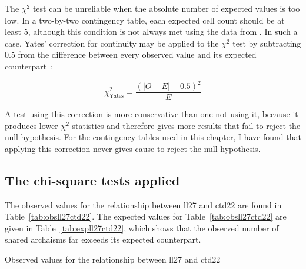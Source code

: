 
The \(\chi^2\) test can be unreliable when the absolute number of expected values is too low. In a two-by-two contingency table, each expected cell count should be at least 5, although this condition is not always met using the data from . In such a case, Yates' correction for continuity may be applied to the \(\chi^2\) test by subtracting 0.5 from the difference between every observed value and its expected counterpart~\autocite[222]{Yat_Contingency34}:

\[\chi_\text{Yates}^2 =  \frac{(|O - E| - 0.5)^2}{E}\]

A test using this correction is more conservative than one not using it, because it produces lower \(\chi^2\) statistics and therefore gives more results that fail to reject the null hypothesis. For the contingency tables used in this chapter, I have found that applying this correction never gives cause to reject the null hypothesis.

\subsection{The chi-square tests applied}
\label{sec:chisqapplied}

The observed values for the relationship between \gls{ll27} and \gls{ctd22} are found in Table~\ref{tab:obsll27ctd22}. 
The expected values for Table~\ref{tab:obsll27ctd22} are given in Table~\ref{tab:expll27ctd22}, which shows that the observed number of shared archaisms far exceeds its expected counterpart.

\begin{table}[h]
  \centering
  \caption{Observed values for the relationship between \acrshort{ll27} and \acrshort{ctd22}}
  \label{tab:obsll27ctd22}
  
\end{table}


